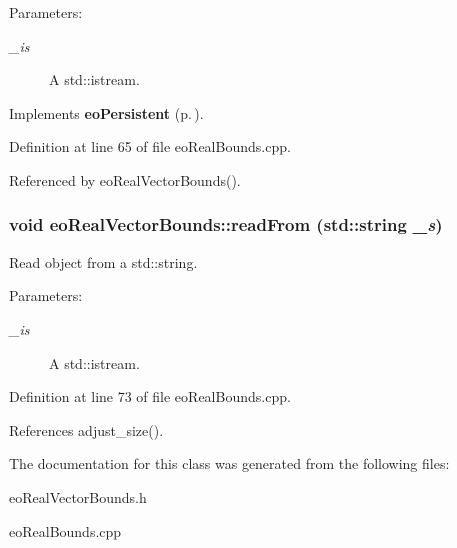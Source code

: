\begin{Desc}
\item[Parameters:]
\begin{description}
\item[{\em \_\-is}]A std::istream. \end{description}
\end{Desc}


Implements {\bf eo\-Persistent} {\rm (p.\,\pageref{classeo_persistent_a1})}.

Definition at line 65 of file eo\-Real\-Bounds.cpp.

Referenced by eo\-Real\-Vector\-Bounds().
\subsubsection{\setlength{\rightskip}{0pt plus 5cm}void eo\-Real\-Vector\-Bounds::read\-From (std::string {\em \_\-s})\hspace{0.3cm}{\tt  [virtual]}}\label{classeo_real_vector_bounds_a8}


Read object from a std::string. 

\begin{Desc}
\item[Parameters:]
\begin{description}
\item[{\em \_\-is}]A std::istream. \end{description}
\end{Desc}


Definition at line 73 of file eo\-Real\-Bounds.cpp.

References adjust\_\-size().

The documentation for this class was generated from the following files:\begin{CompactItemize}
\item 
eo\-Real\-Vector\-Bounds.h\item 
eo\-Real\-Bounds.cpp\end{CompactItemize}
